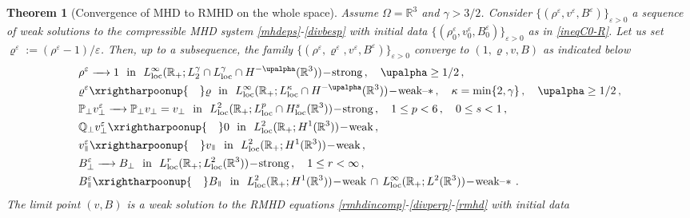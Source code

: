 \documentclass[11pt,reqno]{amsart}
\newtheorem{theorem}{Theorem}
\def \R{{\mathbb{R}}}
\def \Q{{\mathbb{Q}}}
\def \P{{\mathbb{P}}}
\newcommand{\myparallel}{{\mkern3mu\vphantom{\perp}\vrule depth 0pt\mkern2mu\vrule depth 0pt\mkern3mu}}
\begin{document}
\begin{theorem}[Convergence of MHD to RMHD on the whole space] Assume $\Omega=\R^3$ and $\gamma>3/2$. Consider $\{(\rho^\varepsilon,v^\varepsilon, B^\varepsilon)\}_{\varepsilon >0}$ a sequence of weak solutions to the compressible MHD system \eqref{mhdeps}-\eqref{divbesp} with initial data  $\{(\rho_0^\varepsilon,v_0^\varepsilon, B_0^\varepsilon)\}_{\varepsilon >0}$ as in \eqref{ineqC0-R}. Let us set $\varrho^\varepsilon:=(\rho^\varepsilon - 1)/\varepsilon$.  Then, up to a subsequence, the family $\{(\rho^\varepsilon,\varrho^\varepsilon, v^\varepsilon, B^\varepsilon)\}_{\varepsilon >0}$  converge to $(1,\varrho, v, B)$  as indicated below  
  \begin{equation*}
    \label{cv-th-R}
    \begin{aligned}
      & \rho^\varepsilon \xrightarrow{\quad}  1 \ \ \mbox{\rm in }\  L_{\rm loc}^\infty(\R_+; L_2^\gamma \cap L_{\rm loc}^\gamma \cap H^{-\upalpha}(\R^3))\!-\!\mbox{\rm strong} \,,  \quad \upalpha \geq 1/2\,,\\
      &\varrho^\varepsilon \xrightharpoonup{\quad}  \varrho  \ \  \mbox{\rm in } \ L_{\rm loc}^\infty(\R_+;  L_{\rm loc}^\kappa \cap H^{-\upalpha}(\R^3))\!-\!\mbox{\rm weak--}\ast\,, \quad \kappa=\min\{2,\gamma\} \,, \quad \upalpha \geq 1/2\,,  \\
      &\P_\perp v_\perp^\varepsilon \xrightarrow{\quad} \P_\perp v_\perp=v_\perp  \ \ \mbox{\rm in }\  L_{\rm loc}^2(\R_+; L_{\rm loc}^p\cap H_{\rm loc}^s(\R^3))\!-\!\mbox{\rm strong}\,, \quad 1 \leq p < 6\,, \quad 0\leq s <1\,,  \\
      &\Q_\perp v_\perp^\varepsilon  \xrightharpoonup{\quad}  0  \ \ \mbox{\rm in } \ L_{\rm loc}^2(\R_+; H^1(\R^3))\!-\!\mbox{\rm weak}\,, \\
      & v_\myparallel^\varepsilon \xrightharpoonup{\quad}  v_\myparallel  \ \ \mbox{\rm in } \ L_{\rm loc}^2(\R_+; H^1(\R^3))\!-\!\mbox{\rm weak}\,,  \\
      &B_\perp^\varepsilon \xrightarrow{\quad} B_\perp  \ \ \mbox{\rm in } \ L_{\rm loc}^r(\R_+; L_{\rm loc}^2(\R^3))\!-\!\mbox{\rm strong}\,, \quad 1 \leq r < \infty\,,  \\
      &B_\myparallel^\varepsilon \xrightharpoonup{\quad} B_\myparallel  \ \ \mbox{\rm in } \ L_{\rm loc}^2(\R_+; H^1(\R^3))\!-\!\mbox{\rm weak}\, \cap \,
      L_{\rm loc}^\infty(\R_+; L^2(\R^3))\!-\!\mbox{\rm weak--}\!\ast\,. 
    \end{aligned}
  \end{equation*}
  The limit point $(v, B)$ is a weak solution to the RMHD equations \eqref{rmhdincomp}-\eqref{divperp}-\eqref{rmhd} with initial data

\end{theorem}
\end{document}
